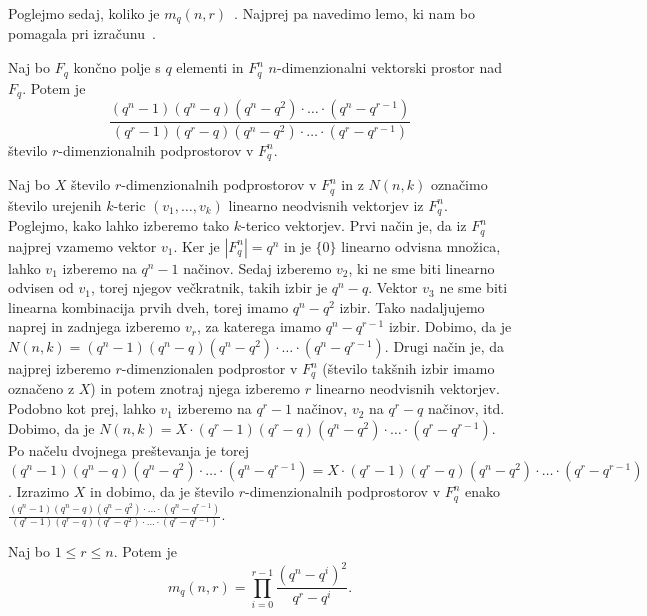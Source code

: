 \documentclass[mat1, tisk]{fmfdelo}
\begin{document}
Poglejmo sedaj, koliko je $m_q(n,r)$~\cite{17ravagnani}. Najprej pa navedimo lemo, ki nam bo pomagala 
pri izračunu~\cite{stanley}.
%
\begin{lema}\label{lema4.1}
  Naj bo $F_q$ končno polje s $q$ elementi in $F_q^n$ $n$-dimenzionalni vektorski 
  prostor nad $F_q$. Potem je 
  \begin{equation*}
    \frac{(q^n - 1)(q^n - q)(q^n - q^2)\cdot\ldots\cdot(q^n - q^{r-1})}{(q^r - 1)(q^r - q)(q^n - q^2)\cdot\ldots\cdot(q^r - q^{r-1})}
  \end{equation*}
  število $r$-dimenzionalnih podprostorov v $F_q^n$.
\end{lema}
\begin{dokaz}
  Naj bo $X$ število $r$-dimenzionalnih podprostorov v $F_q^n$ in z $N(n, k)$ označimo 
  število urejenih $k$-teric $(v_1, \ldots, v_k)$ linearno neodvisnih vektorjev iz $F_q^n$. 
  Poglejmo, kako lahko izberemo tako $k$-terico vektorjev. 
  Prvi način je, da iz $F_q^n$ najprej vzamemo vektor $v_1$. Ker je $|F_q^n| = q^n$ 
  in je $\{0\}$ linearno odvisna množica, lahko $v_1$ izberemo na $q^n - 1$ načinov. Sedaj 
  izberemo $v_2$, ki ne sme biti linearno odvisen od $v_1$, torej njegov večkratnik, takih izbir je $q^n - q$. Vektor $v_3$ 
  ne sme biti linearna kombinacija prvih dveh, torej imamo $q^n - q^2$ izbir. Tako nadaljujemo 
  naprej in zadnjega izberemo $v_r$, za katerega imamo $q^n - q^{r-1}$ izbir. Dobimo, da 
  je $N(n, k) = (q^n - 1)(q^n - q)(q^n - q^2)\cdot\ldots\cdot(q^n - q^{r-1})$.
  Drugi način je, da najprej izberemo $r$-dimenzionalen podprostor v $F_q^n$ (število takšnih 
  izbir imamo označeno z $X$) in potem znotraj njega izberemo $r$ linearno neodvisnih 
  vektorjev. Podobno kot prej, lahko $v_1$ izberemo na $q^r - 1$ načinov, $v_2$ na $q^r - q$
  načinov, itd. Dobimo, da je $N(n, k) = X \cdot (q^r - 1)(q^r - q)(q^n - q^2)\cdot\ldots\cdot(q^r - q^{r-1})$.
  Po načelu dvojnega preštevanja je torej 
  $(q^n - 1)(q^n - q)(q^n - q^2)\cdot\ldots\cdot(q^n - q^{r-1}) = X \cdot (q^r - 1)(q^r - q)(q^n - q^2)\cdot\ldots\cdot(q^r - q^{r-1})$. 
  Izrazimo $X$ in dobimo, da je število $r$-dimenzionalnih podprostorov v $F_q^n$ enako 
  $\frac{(q^n - 1)(q^n - q)(q^n - q^2)\cdot\ldots\cdot(q^n - q^{r-1})}{(q^r - 1)(q^r - q)(q^r - q^2)\cdot\ldots\cdot(q^r - q^{r-1})}$.
\end{dokaz}
%
\begin{trditev}\label{trditev4.2}
  Naj bo $1 \leq r \leq n$. Potem je 
  \begin{equation*}
    m_q(n,r) = \prod\limits_{i=0}^{r-1} \frac{(q^n - q^i)^2}{q^r - q^i}.
  \end{equation*}
\end{trditev}
\end{document}
